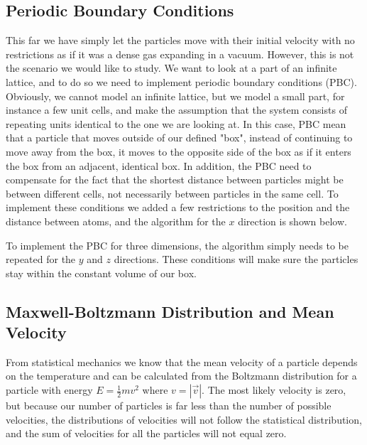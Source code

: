 \documentclass{article}
\begin{document}
\subsection{Periodic Boundary Conditions}
This far we have simply let the particles move with their initial velocity with no restrictions as if it was a dense gas expanding in a vacuum. However, this is not the scenario we would like to study. We want to look at a part of an infinite lattice, and to do so we need to implement periodic boundary conditions (PBC). Obviously, we cannot model an infinite lattice, but we model a small part, for instance a few unit cells, and make the assumption that the system consists of repeating units identical to the one we are looking at. In this case, PBC mean that a particle that moves outside of our defined "box", instead of continuing to move away from the box, it moves to the opposite side of the box as if it enters the box from an adjacent, identical box. In addition, the PBC need to compensate for the fact that the shortest distance between particles might be between different cells, not necessarily between particles in the same cell. To implement these conditions we added a few restrictions to the position and the distance between atoms, and the algorithm for the $x$ direction is shown below.

\begin{algorithm}[h]
\end{algorithm}
To implement the PBC for three dimensions, the algorithm simply needs to be repeated for the $y$ and $z$ directions. These conditions will make sure the particles stay within the constant volume of our box.


\subsection{Maxwell-Boltzmann Distribution and Mean Velocity}
From statistical mechanics we know that the mean velocity of a particle depends on the temperature and can be calculated from the Boltzmann distribution for a particle with energy $E=\frac{1}{2}mv^2$ where $v=|\vec{v}|$. The most likely velocity is zero, but because our number of particles is far less than the number of possible velocities, the distributions of velocities will not follow the statistical distribution, and the sum of velocities for all the particles will not equal zero.
\end{document}

